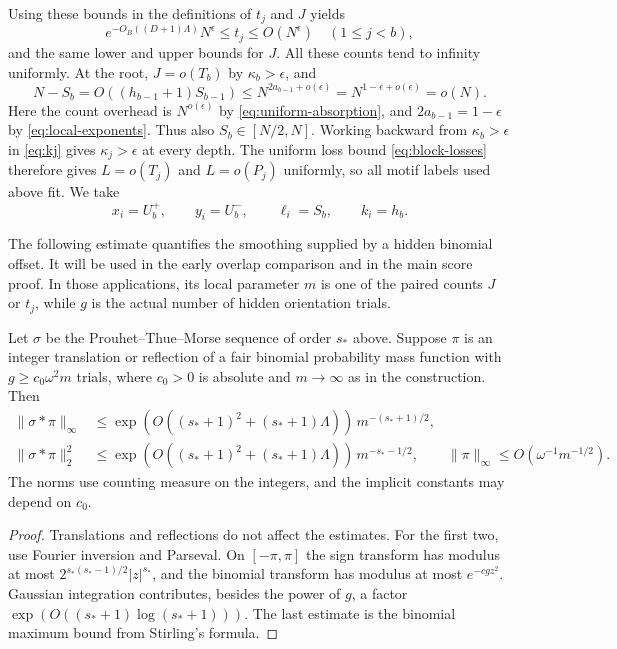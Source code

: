 Using these bounds in the definitions of $t_j$ and $J$ yields
\begin{equation}\label{eq:scale_t}
 e^{-O_B((D+1)\Lambda)}N^\epsilon\le t_j\le O(N^\epsilon)
       \quad(1\le j<b),
\end{equation}
and the same lower and upper bounds for $J$.  All these counts tend to infinity uniformly.  At the root, $J=o(T_b)$ by $\kappa_b>\epsilon$, and
\[
 N-S_b=O((h_{b-1}+1)S_{b-1})
 \le N^{2a_{b-1}+o(\epsilon)}
 =N^{1-\epsilon+o(\epsilon)}=o(N).
\]
Here the count overhead is $N^{o(\epsilon)}$ by \eqref{eq:uniform-absorption}, and $2a_{b-1}=1-\epsilon$ by \eqref{eq:local-exponents}.  Thus also $S_b\in[N/2,N]$.  Working backward from $\kappa_b>\epsilon$ in \eqref{eq:kj} gives $\kappa_j>\epsilon$ at every depth.  The uniform loss bound \eqref{eq:block-losses} therefore gives $L=o(T_j)$ and $L=o(P_j)$ uniformly, so all motif labels used above fit.  We take
\[
 x_i=U_b^+,\qquad y_i=U_b^-,\qquad \ell_i=S_b,\qquad k_i=h_b.
\]

The following estimate quantifies the smoothing supplied by a hidden binomial offset.  It will be used in the early overlap comparison and in the main score proof.  In those applications, its local parameter $m$ is one of the paired counts $J$ or $t_j$, while $g$ is the actual number of hidden orientation trials.
\begin{lemma}\label{lem:binomial-smoothing}
Let $\sigma$ be the Prouhet--Thue--Morse sequence of order $s_*$ above.  Suppose $\pi$ is an integer translation or reflection of a fair binomial probability mass function with $g\ge c_0\omega^2m$ trials, where $c_0>0$ is absolute and $m\to\infty$ as in the construction.  Then
\begin{align}
 \|\sigma*\pi\|_\infty
 &\le \exp(O((s_*+1)^2+(s_*+1)\Lambda))\,
       m^{-(s_*+1)/2},\nonumber\\
 \|\sigma*\pi\|_2^2
 &\le \exp(O((s_*+1)^2+(s_*+1)\Lambda))\,
       m^{-s_*-1/2},\qquad
 \|\pi\|_\infty\le O(\omega^{-1}m^{-1/2}).\label{eq:sig_conv}
\end{align}
The norms use counting measure on the integers, and the implicit constants may depend on $c_0$.
\end{lemma}

\begin{proof}
Translations and reflections do not affect the estimates.  For the first two, use Fourier inversion and Parseval.  On $[-\pi,\pi]$ the sign transform has modulus at most $2^{s_*(s_*-1)/2}|z|^{s_*}$, and the binomial transform has modulus at most $e^{-cgz^2}$.  Gaussian integration contributes, besides the power of $g$, a factor $\exp(O((s_*+1)\log(s_*+1)))$.  The last estimate is the binomial maximum bound from Stirling's formula.
\end{proof}

